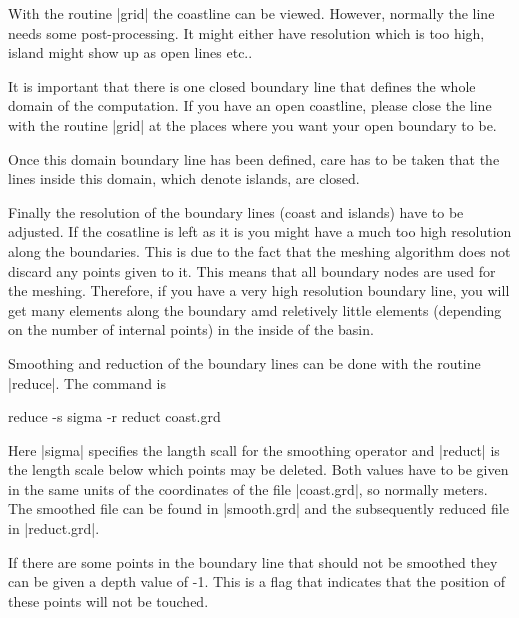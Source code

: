 

With the routine |grid| the coastline can be viewed.
However, normally the line needs some post-processing.
It might either have resolution which is too high, island
might show up as open lines etc..

It is important that there is one closed boundary line that
defines the whole domain of the computation. If you have an
open coastline, please close the line with the routine |grid|
at the places where you want your open boundary to be.

Once this domain boundary line has been defined, care has
to be taken that the lines inside this domain, which denote
islands, are closed.

Finally the resolution of the boundary lines (coast and islands)
have to be adjusted. If the cosatline is left as it is you might
have a much too high resolution along the boundaries. This is due
to the fact that the meshing algorithm does not discard any points
given to it. This means that all boundary nodes are used for the meshing.
Therefore, if you have a very high resolution boundary line, you will
get many elements along the boundary amd reletively little elements
(depending on the number of internal points) in the inside of the
basin.

Smoothing and reduction of the boundary lines can be done with the
routine |reduce|. The command is

\begin{code}
    reduce -s sigma -r reduct coast.grd
\end{code}

Here |sigma| specifies the langth scall for the smoothing operator
and |reduct| is the length scale below which points may be deleted.
Both values have to be given in the same units of the coordinates
of the file |coast.grd|, so normally meters.
The smoothed file can be found in |smooth.grd| and the subsequently
reduced file in |reduct.grd|. 

If there are some points in the boundary line that should not be smoothed
they can be given a depth value of -1. This is a flag that indicates
that the position of these points will not be touched.


